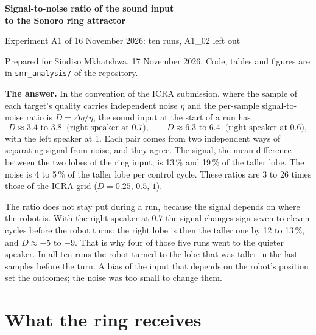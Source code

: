 \documentclass[11pt,a4paper]{article}
\newcommand{\dq}{\Delta q}
\newcommand{\code}[1]{\texttt{#1}}
\begin{document}
{\sffamily\bfseries\LARGE Signal-to-noise ratio of the sound input\\[2pt] to the Sonoro ring attractor\par}
\vspace{4pt}
{\sffamily\large Experiment A1 of 16 November 2026: ten runs, A1\_02 left out\par}
\vspace{2pt}
{\small Prepared for Sindiso Mkhatshwa, 17 November 2026. Code, tables and figures are in \code{snr\_analysis/} of the repository.\par}
\vspace{6pt}

\begin{mdframed}[backgroundcolor=boxbg,linecolor=rule,linewidth=0.6pt,innertopmargin=8pt,innerbottommargin=8pt,innerleftmargin=10pt,innerrightmargin=10pt]
\textbf{The answer.} In the convention of the ICRA submission, where the sample of each target's quality carries
independent noise $\eta$ and the per-sample signal-to-noise ratio is $D=\dq/\eta$, the sound input at the start
of a run has
\[
D \approx 3.4\text{ to }3.8 \;\;\text{(right speaker at 0.7)}, \qquad D \approx 6.3\text{ to }6.4 \;\;\text{(right speaker at 0.6)},
\]
with the left speaker at 1. Each pair comes from two independent ways of separating signal from noise, and they
agree. The signal, the mean difference between the two lobes of the ring input, is 13\,\% and 19\,\% of the taller
lobe. The noise is 4 to 5\,\% of the taller lobe per control cycle. These ratios are 3 to 26 times those of the ICRA
grid ($D=0.25$, $0.5$, $1$).

The ratio does not stay put during a run, because the signal depends on where the robot is. With the right
speaker at 0.7 the signal changes sign seven to eleven cycles before the robot turns: the right lobe is then the
taller one by 12 to 13\,\%, and $D\approx-5$ to $-9$. That is why four of those five runs went to the quieter speaker. In all ten runs the robot turned to the lobe that was taller in the last samples before the turn. A bias of the
input that depends on the robot's position set the outcomes; the noise was too small to change them.
\end{mdframed}

\section{What the ring receives}
\end{document}
